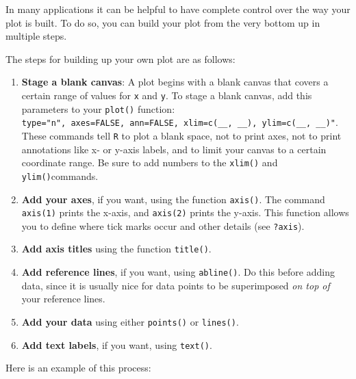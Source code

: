 \documentclass[]{book}
\begin{document}
In many applications it can be helpful to have complete control over the way your plot is built. To do so, you can build your plot from the very bottom up in multiple steps.

The steps for building up your own plot are as follows:

\begin{enumerate}
\def\labelenumi{\arabic{enumi}.}
\item
  \textbf{Stage a blank canvas}: A plot begins with a blank canvas that covers a certain range of values for \texttt{x} and \texttt{y}. To stage a blank canvas, add this parameters to your \texttt{plot()} function: \texttt{type="n",\ axes=FALSE,\ ann=FALSE,\ xlim=c(\_\_,\ \_\_),\ ylim=c(\_\_,\ \_\_)"}. These commands tell \texttt{R} to plot a blank space, not to print axes, not to print annotations like x- or y-axis labels, and to limit your canvas to a certain coordinate range. Be sure to add numbers to the \texttt{xlim()} and \texttt{ylim()}commands.
\item
  \textbf{Add your axes}, if you want, using the function \texttt{axis()}. The command \texttt{axis(1)} prints the x-axis, and \texttt{axis(2)} prints the y-axis. This function allows you to define where tick marks occur and other details (see \texttt{?axis}).
\item
  \textbf{Add axis titles} using the function \texttt{title()}.
\item
  \textbf{Add reference lines}, if you want, using \texttt{abline()}. Do this before adding data, since it is usually nice for data points to be superimposed \emph{on top of} your reference lines.
\item
  \textbf{Add your data} using either \texttt{points()} or \texttt{lines()}.
\item
  \textbf{Add text labels}, if you want, using \texttt{text()}.
\end{enumerate}

Here is an example of this process:
\end{document}
